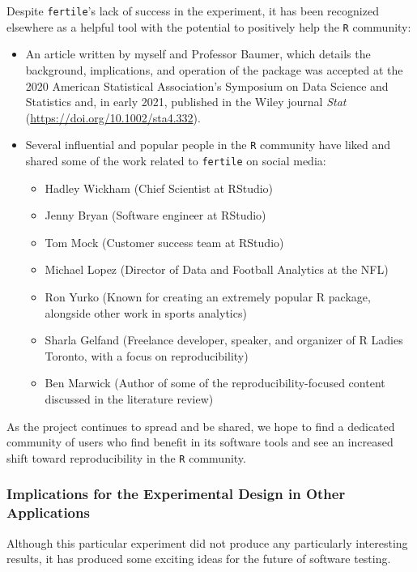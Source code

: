 \documentclass[12pt,twoside]{reedthesis}
\providecommand{\tightlist}{%
  \setlength{\itemsep}{0pt}\setlength{\parskip}{0pt}}
\begin{document}
Despite \texttt{fertile}'s lack of success in the experiment, it has been recognized elsewhere as a helpful tool with the potential to positively help the \texttt{R} community:
\begin{itemize}
\item
  An article written by myself and Professor Baumer, which details the background, implications, and operation of the package was accepted at the 2020 American Statistical Association's Symposium on Data Science and Statistics and, in early 2021, published in the Wiley journal \emph{Stat} (\url{https://doi.org/10.1002/sta4.332}).
\item
  Several influential and popular people in the \texttt{R} community have liked and shared some of the work related to \texttt{fertile} on social media:
  \begin{itemize}
  \tightlist
  \item
    Hadley Wickham (Chief Scientist at RStudio)
  \item
    Jenny Bryan (Software engineer at RStudio)
  \item
    Tom Mock (Customer success team at RStudio)
  \item
    Michael Lopez (Director of Data and Football Analytics at the NFL)
  \item
    Ron Yurko (Known for creating an extremely popular R package, alongside other work in sports analytics)
  \item
    Sharla Gelfand (Freelance developer, speaker, and organizer of R Ladies Toronto, with a focus on reproducibility)
  \item
    Ben Marwick (Author of some of the reproducibility-focused content discussed in the literature review)
  \end{itemize}
\end{itemize}
As the project continues to spread and be shared, we hope to find a dedicated community of users who find benefit in its software tools and see an increased shift toward reproducibility in the \texttt{R} community.

\hypertarget{implications-for-the-experimental-design-in-other-applications}{%
\subsubsection{Implications for the Experimental Design in Other Applications}\label{implications-for-the-experimental-design-in-other-applications}}

Although this particular experiment did not produce any particularly interesting results, it has produced some exciting ideas for the future of software testing.
\end{document}

